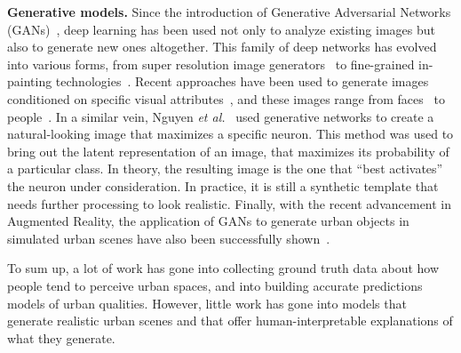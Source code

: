 \vspace{4pt}\noindent
\textbf{Generative models.} Since the introduction of Generative Adversarial Networks (GANs)~\cite{goodfellow2014generative}, deep learning has been used not only to analyze existing images but also to generate new ones altogether. This family of deep networks has evolved into various forms, from super resolution image generators~\cite{ledig2017photo} to fine-grained in-painting technologies~\cite{pathak2016context}. Recent approaches have been used to generate images conditioned on specific visual attributes~\cite{yan2015attribute2image}, and these images range from faces~\cite{taigman2016unsupervised} to people~\cite{ma2018disentangled}. In a similar vein, Nguyen \emph{et al.}~\cite{nguyen2016synthesizing} used generative networks to create a natural-looking image that maximizes a specific neuron. This method was used to bring out the latent representation of an image, that maximizes its probability of a particular class. In theory, the resulting image is the one that ``best activates'' the neuron under consideration. In practice, it is still a synthetic template that needs further processing to look realistic.   Finally, with the recent advancement in Augmented Reality, the application of GANs to generate urban objects in simulated urban scenes have also been successfully shown~\cite{alhaija2018augmented}. 

\vspace{4pt}
To sum up, a lot of work has gone into collecting ground truth data about how people tend to perceive urban spaces, and into building accurate predictions models of urban qualities. However,  little work has gone into models that generate realistic urban scenes and that offer human-interpretable explanations of what they generate. 


